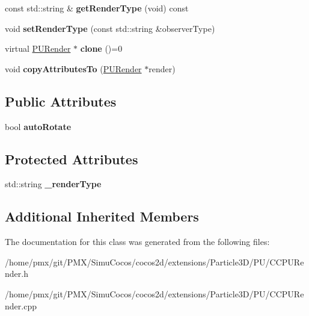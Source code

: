 \begin{DoxyCompactItemize}
\item 
\mbox{\label{classPURender_a75d04ca089236c0d985ea7460e958db0}} 
const std\+::string \& {\bfseries get\+Render\+Type} (void) const
\item 
\mbox{\label{classPURender_acdf563e657b29aa613529c6a43872abb}} 
void {\bfseries set\+Render\+Type} (const std\+::string \&observer\+Type)
\item 
\mbox{\label{classPURender_a7f1139b3e8b20983cffbfe863eba5464}} 
virtual \hyperlink{classPURender}{P\+U\+Render} $\ast$ {\bfseries clone} ()=0
\item 
\mbox{\label{classPURender_a0426b431ba02387081df98cfc550025c}} 
void {\bfseries copy\+Attributes\+To} (\hyperlink{classPURender}{P\+U\+Render} $\ast$render)
\end{DoxyCompactItemize}
\subsection*{Public Attributes}
\begin{DoxyCompactItemize}
\item 
\mbox{\label{classPURender_a69662587c505375e8da6b107cc2d7025}} 
bool {\bfseries auto\+Rotate}
\end{DoxyCompactItemize}
\subsection*{Protected Attributes}
\begin{DoxyCompactItemize}
\item 
\mbox{\label{classPURender_ab21ea6bb819b2861ad751e1b8ea90c31}} 
std\+::string {\bfseries \+\_\+render\+Type}
\end{DoxyCompactItemize}
\subsection*{Additional Inherited Members}


The documentation for this class was generated from the following files\+:\begin{DoxyCompactItemize}
\item 
/home/pmx/git/\+P\+M\+X/\+Simu\+Cocos/cocos2d/extensions/\+Particle3\+D/\+P\+U/C\+C\+P\+U\+Render.\+h\item 
/home/pmx/git/\+P\+M\+X/\+Simu\+Cocos/cocos2d/extensions/\+Particle3\+D/\+P\+U/C\+C\+P\+U\+Render.\+cpp\end{DoxyCompactItemize}
